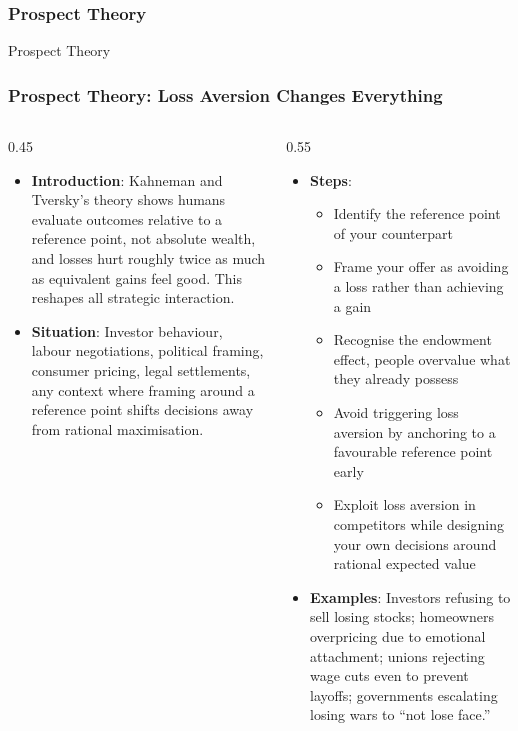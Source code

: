 \begin{frame}[fragile]\frametitle{Prospect Theory}
\begin{center}
{\Large Prospect Theory}
\end{center}
\end{frame}



\begin{frame}[fragile]\frametitle{Prospect Theory: Loss Aversion Changes Everything}
\begin{columns}
    \begin{column}[T]{0.45\linewidth}
      \begin{itemize}
        \item \textbf{Introduction}: Kahneman and Tversky's theory shows humans evaluate outcomes relative to a reference point, not absolute wealth, and losses hurt roughly twice as much as equivalent gains feel good. This reshapes all strategic interaction.
        \item \textbf{Situation}: Investor behaviour, labour negotiations, political framing, consumer pricing, legal settlements, any context where framing around a reference point shifts decisions away from rational maximisation.
      \end{itemize}
    \end{column}
    \begin{column}[T]{0.55\linewidth}
      \begin{itemize}
        \item \textbf{Steps}:
        \begin{itemize}
          \item Identify the reference point of your counterpart
          \item Frame your offer as avoiding a loss rather than achieving a gain
          \item Recognise the endowment effect, people overvalue what they already possess
          \item Avoid triggering loss aversion by anchoring to a favourable reference point early
          \item Exploit loss aversion in competitors while designing your own decisions around rational expected value
        \end{itemize}\item \textbf{Examples}: Investors refusing to sell losing stocks; homeowners overpricing due to emotional attachment; unions rejecting wage cuts even to prevent layoffs; governments escalating losing wars to ``not lose face.''
      \end{itemize}
    \end{column}
  \end{columns}
\end{frame}

